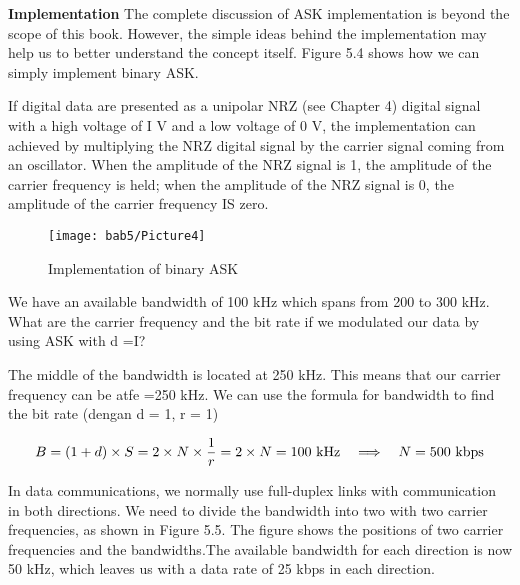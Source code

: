 \textbf{Implementation} The complete discussion of ASK implementation is beyond the scope of this book. However, the simple ideas behind the implementation may help us to better understand the concept itself. Figure 5.4 shows how we can simply implement binary ASK.

If digital data are presented as a unipolar NRZ (see Chapter 4) digital signal with a high voltage of I V and a low voltage of 0 V, the implementation can achieved by multiplying the NRZ digital signal by the carrier signal coming from an oscillator. When the amplitude of the NRZ signal is 1, the amplitude of the carrier frequency is held; when the amplitude of the NRZ signal is 0, the amplitude of the carrier frequency IS zero.

\begin{figure}[htbp]
  \centering
  \texttt{[image: bab5/Picture4]}
  \caption{Implementation of binary ASK}
  \label{fig5:4}
\end{figure}

\vspace{12pt}

\begin{example}
  We have an available bandwidth of 100 kHz which spans from 200 to 300 kHz. What are the carrier frequency and the bit rate if we modulated our data by using ASK with d =I?
  \label{example5:3}
\end{example}

\begin{solution}
  The middle of the bandwidth is located at 250 kHz. This means that our carrier frequency can be atfe =250 kHz. We can use the formula for bandwidth to find the bit rate (dengan d = 1, r = 1)

  \begin{equation*}
    B = (1 + d) \times S = 2 \times N \times \frac{1}{r} = 2 \times N = 100 \textnormal{ kHz} \quad \Longrightarrow \quad N = 500 \textnormal{ kbps}
  \end{equation*}
\end{solution}

\vspace{12pt}

\begin{example}
  In data communications, we normally use full-duplex links with communication in both directions. We need to divide the bandwidth into two with two carrier frequencies, as shown in Figure 5.5. The figure shows the positions of two carrier frequencies and the bandwidths.The available bandwidth for each direction is now 50 kHz, which leaves us with a data rate of 25 kbps in each direction.
  \label{example5:4}
\end{example}

